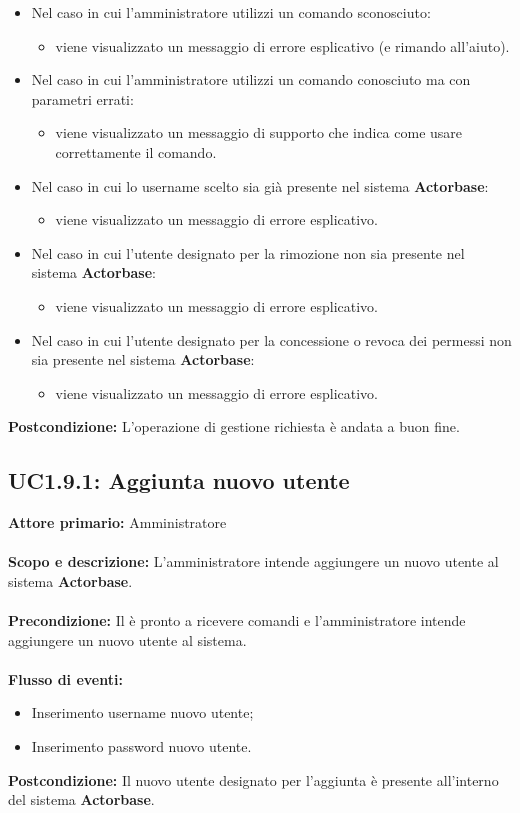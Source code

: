 \documentclass{scalatekids-article}
\begin{document}
\begin{itemize}
\item Nel caso in cui l'amministratore utilizzi un comando sconosciuto:
  \begin{itemize}
  \item viene visualizzato un messaggio di errore esplicativo (e rimando all'aiuto).
  \end{itemize}
\item Nel caso in cui l'amministratore utilizzi un comando conosciuto ma con parametri errati:
  \begin{itemize}
  \item viene visualizzato un messaggio di supporto che indica come usare correttamente il comando.
  \end{itemize}
\item Nel caso in cui lo username scelto sia già presente nel sistema \textbf{Actorbase}:
  \begin{itemize}
  \item viene visualizzato un messaggio di errore esplicativo.
  \end{itemize}
\item Nel caso in cui l'utente designato per la rimozione non sia presente nel sistema \textbf{Actorbase}:
  \begin{itemize}
  \item viene visualizzato un messaggio di errore esplicativo.
  \end{itemize}
\item Nel caso in cui l'utente designato per la concessione o revoca dei permessi non sia presente nel sistema \textbf{Actorbase}:
  \begin{itemize}
  \item viene visualizzato un messaggio di errore esplicativo.
  \end{itemize}
\end{itemize}
\textbf{Postcondizione:} L'operazione di gestione richiesta è andata a buon fine.
\subsection{UC1.9.1: Aggiunta nuovo utente}
\textbf{Attore primario:} Amministratore\\ \\
\textbf{Scopo e descrizione:} L'amministratore intende aggiungere un nuovo utente al sistema \textbf{Actorbase}.\\ \\
\textbf{Precondizione:} Il  è pronto a ricevere comandi e l'amministratore intende aggiungere un nuovo utente al sistema.\\ \\
\textbf{Flusso di eventi:}
\begin{itemize}
\item Inserimento username nuovo utente;
\item Inserimento password nuovo utente.
\end{itemize}
\textbf{Postcondizione:} Il nuovo utente designato per l'aggiunta è presente all'interno del sistema \textbf{Actorbase}.
\end{document}
